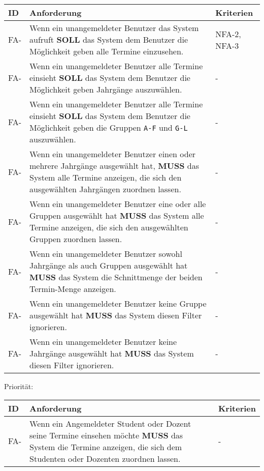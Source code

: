 \begin{tabular} {|p{}|p{11cm}|p{}|}
	\hline
	ID & Anforderung & Kriterien \\
	\hline
	FA-
	& Wenn ein unangemeldeter Benutzer das System aufruft \textbf{SOLL} das System dem Benutzer die Möglichkeit geben alle Termine einzusehen. 
	& NFA-2, NFA-3 \\
	\hline
	FA- 
	& Wenn ein unangemeldeter Benutzer alle Termine einsieht \textbf{SOLL} das System dem Benutzer die Möglichkeit geben Jahrgänge auszuwählen.
	& -  \\
	\hline
	FA- 
	& Wenn ein unangemeldeter Benutzer alle Termine einsieht \textbf{SOLL} das System dem Benutzer die Möglichkeit geben die Gruppen \texttt{A-F} und \texttt{G-L} auszuwählen.
	& - \\
	\hline
	FA-
	& Wenn ein unangemeldeter Benutzer einen oder mehrere Jahrgänge ausgewählt hat, \textbf{MUSS} das System alle Termine anzeigen, die sich den ausgewählten Jahrgängen zuordnen lassen.
	& - \\
	\hline
	FA-
	& Wenn ein unangemeldeter Benutzer eine oder alle Gruppen ausgewählt hat \textbf{MUSS} das System alle Termine anzeigen, die sich den ausgewählten Gruppen zuordnen lassen.
	& - \\
	\hline
	FA-
	& Wenn ein unangemeldeter Benutzer sowohl Jahrgänge als auch Gruppen ausgewählt hat \textbf{MUSS} das System die Schnittmenge der beiden Termin-Menge anzeigen.
	& - \\
	\hline
	FA-
	& Wenn ein unangemeldeter Benutzer keine Gruppe ausgewählt hat \textbf{MUSS} das System diesen Filter ignorieren.
	& - \\
	\hline
	FA-
	& Wenn ein unangemeldeter Benutzer keine Jahrgänge ausgewählt hat \textbf{MUSS} das System diesen Filter ignorieren.
	& - \\
	\hline
\end{tabular}
Priorität: 

\newpage

\begin{tabular} {|p{}|p{11cm}|p{}|}
	\hline
	ID & Anforderung & Kriterien \\
	\hline
	FA-
	& Wenn ein Angemeldeter Student oder Dozent seine Termine einsehen möchte \textbf{MUSS} das System die Termine anzeigen, die sich dem Studenten oder Dozenten zuordnen lassen. 
	& - \\
	\hline
\end{tabular}

\newpage

